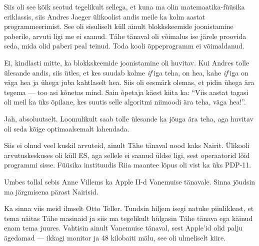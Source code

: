 
Siis oli see kõik seotud tegelikult sellega, et kuna ma olin 
matemaatika-füüsika eriklassis, siis Andres Jaeger ülikoolist andis meile ka kolm aastat programmeerimist. See oli sisuliselt
küll ainult blokkskeemide joonistamine 
paberile, arvuti ligi me ei saanud. Tähe tänaval oli võimalus 
ise järele proovida seda, mida olid paberi peal teinud. 
Toda kooli õppeprogramm ei võimaldanud.


Ei, kindlasti mitte, ka blokkskeemide joonistamine 
oli huvitav. Kui Andres tolle ülesande andis, siis ütles, et kes 
suudab kolme \emph{if}'iga teha, on hea, kahe \emph{if}'iga on 
väga hea ja ühega juba kahtlaselt hea. Siis oli eesmärk olemas, et 
pidin ühega ära tegema --- too asi kõnetas mind. Sain õpetaja käest 
kiita ka: \enquote{Viis aastat tagasi oli 
meil ka üks õpilane, kes suutis selle algoritmi niimoodi ära teha, 
väga hea!}.


Jah, absoluutselt. Loomulikult saab tolle ülesande ka jõuga ära teha, aga huvitav oli seda kõige optimaalsemalt lahendada.


Siis ei olnud veel kuskil arvuteid, ainult Tähe tänaval 
nood kaks Nairit. Ülikooli arvutuskeskuses oli küll ES, aga sellele ei saanud üldse 
ligi, sest operaatorid lõid programmi sisse. Füüsika 
instituudis Riia maantee lõpus oli vist ka 
üks PDP-11.

Umbes tollal sebis Anne Villems 
ka Apple II-d Vanemuise 
tänavale. Sinna jõudsin ma 
järgmisena pärast Nairisid. 

Ka sinna viis meid ilmselt Otto Teller. Tundsin hiljem isegi
natuke piinlikkust, et tema näitas Tähe masinaid ja siis ma tegelikult 
hülgasin Tähe tänava ega käinud enam tema juures. Vahtisin ainult 
Vanemuise tänaval, sest Apple'id olid palju ägedamad --- ikkagi monitor ja 48
kilobaiti mälu, see oli ulmeliselt kiire.

